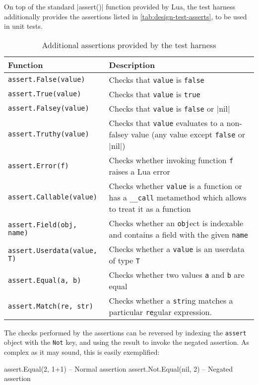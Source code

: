 
On top of the standard \Mlua|assert()| function provided by Lua, the test
harness additionally provides the assertions listed in
\autoref{tab:design-test-asserts}, to be used in unit tests.

\begin{table}[htH]
	\centering
	\begin{tabular}{lp{}}
	\toprule
	Function & Description \\
	\midrule
		\verb|assert.False(value)| &
			Checks that \texttt{value} is \verb|false| \\
		\verb|assert.True(value)| &
			Checks that \texttt{value} is \verb|true| \\
		\verb|assert.Falsey(value)| &
			Checks that \texttt{value} is \verb|false| or \Mlua|nil| \\
		\verb|assert.Truthy(value)| &
			Checks that \texttt{value} evaluates to a non-falsey value (any value
			except \verb|false| or \Mlua|nil|) \\
		\verb|assert.Error(f)| &
			Checks whether invoking function \texttt{f} raises a Lua error \\
		\verb|assert.Callable(value)| &
			Checks whether \texttt{value} is a function or has a \texttt{\_\_call}
			metamethod which allows to treat it as a function \\
		\verb|assert.Field(obj, name)| &
			Checks whether an \texttt{obj}ect is indexable and contains a field with
			the given \texttt{name} \\
		\verb|assert.Userdata(value, T)| &
			Checks whether a \texttt{value} is an userdata of type \texttt{T} \\
		\verb|assert.Equal(a, b)| &
			Checks whether two values \texttt{a} and \texttt{b} are equal \\
		\verb|assert.Match(re, str)| &
			Checks whether a \texttt{str}ing matches a particular \texttt{re}gular
			expression. \\
	\bottomrule
	\end{tabular}
	\caption{Additional assertions provided by the test harness}
	\label{tab:design-test-asserts}
\end{table}

The checks performed by the assertions can be reversed by indexing the
\verb|assert| object with the \verb|Not| key, and using the result to invoke
the negated assertion. As complex as it may sound, this is easily exemplified:

\begin{luacode}
assert.Equal(2, 1+1)     -- Normal assertion
assert.Not.Equal(nil, 2) -- Negated assertion
\end{luacode}

